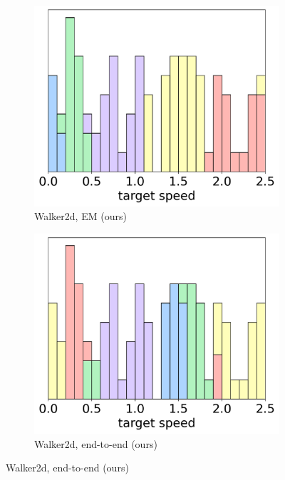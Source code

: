 \begin{figure}[t]
\begin{center}
    \begin{subfigure}{0.3\textwidth}
        \centering
        \caption{Walker2d, EM (ours)}
        \includegraphics[width=\linewidth]{pics/histograms/em/Walker2d.png}
    \end{subfigure}\hspace{10pt}%
    \begin{subfigure}{0.3\textwidth}
        \centering
        \caption{Walker2d, end-to-end (ours)}
        \includegraphics[width=\linewidth]{pics/histograms/end-to-end/Walker2d.png}
    \end{subfigure}\hspace{10pt}%

\end{center}
\end{figure}
